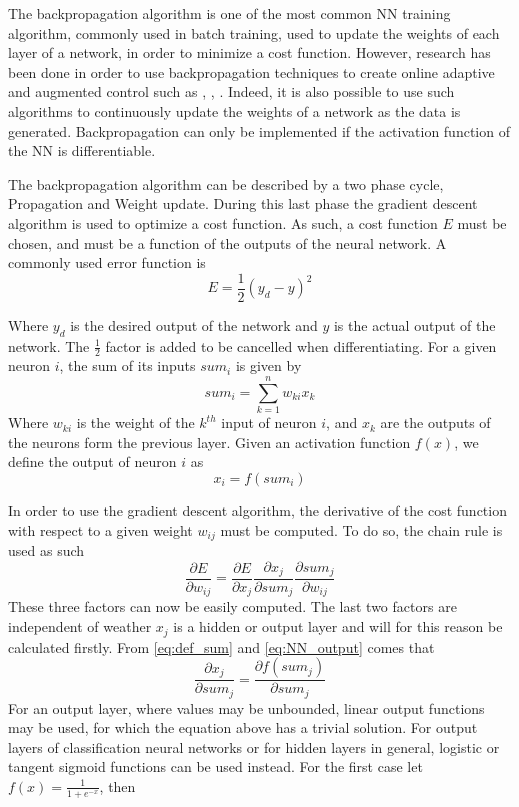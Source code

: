 The backpropagation algorithm is one of the most common NN training algorithm, commonly used in batch training, used to update the weights of each layer of a network, in order to minimize a cost function. However, research has been done in order to use backpropagation techniques to create online adaptive and augmented control such as \cite{online_adaptiveNN}, \cite{UAV_adaptive}, \cite{UAV_adaptive2}. Indeed, it is also possible to use such algorithms to continuously update the weights of a network as the data is generated. Backpropagation can only be implemented if the activation function of the NN is differentiable. 

The backpropagation algorithm can be described by a two phase cycle, Propagation and Weight update. During this last phase the gradient descent algorithm is used to optimize a cost function. As such, a cost function $E$ must be chosen, and must be a function of the outputs of the neural network. A commonly used error function is 
\begin{equation}
E=\frac{1}{2} (y_d-y)^2
\end{equation}

Where $y_d$ is the desired output of the network and $y$ is the actual output of the network. The $\frac{1}{2}$ factor is added to be cancelled when differentiating. For a given neuron $i$, the sum of its inputs $sum_i$ is given by
\begin{equation}\label{eq:def_sum}
sum_i = \sum ^n_{k=1} w_{ki} x_k
\end{equation}
Where $w_{ki}$ is the weight of the $k^{th}$ input of neuron $i$, and $x_k$ are the outputs of the neurons form the previous layer. Given an activation function $f(x)$, we define the output of neuron $i$ as 
\begin{equation}\label{eq:NN_output}
x_i = f(sum_i)
\end{equation}

In order to use the gradient descent algorithm, the derivative of the cost function with respect to a given weight $w_{ij}$ must be computed. To do so, the chain rule is used as such
\begin{equation}\label{eq:gradient}
\frac{\partial E}{\partial w_{ij}} = \frac{\partial E}{\partial x_j}\frac{\partial x_j}{\partial sum_j}\frac{\partial sum_j}{\partial w_{ij}}
\end{equation}
These three factors can now be easily computed. The last two factors are independent of weather $x_j$ is a hidden or output layer and will for this reason be calculated firstly. From \ref{eq:def_sum} and \ref{eq:NN_output} comes that
\begin{equation}
\frac{\partial x_j}{\partial sum_j} = \frac{\partial f(sum_j)}{\partial sum_j}
\end{equation}
For an output layer, where values may be unbounded, linear output functions may be used, for which the equation above has a trivial solution. For output layers of classification neural networks or for hidden layers in general, logistic or tangent sigmoid functions can be used instead. For the first case let $f(x)=\frac{1}{1+e^{-x}}$, then

